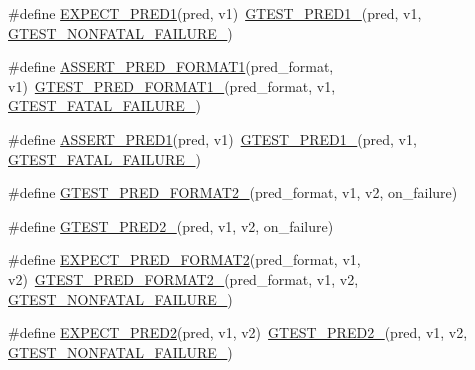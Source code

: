 \begin{DoxyCompactItemize}
\item 
\#define \hyperlink{fused-src_2gtest_2gtest_8h_a6d09aa83f8d297481380c7c073c9f070}{E\-X\-P\-E\-C\-T\-\_\-\-P\-R\-E\-D1}(pred, v1)~\hyperlink{gtest__pred__impl_8h_ad44cf322952076d85305bbdf39769ac1}{G\-T\-E\-S\-T\-\_\-\-P\-R\-E\-D1\-\_\-}(pred, v1, \hyperlink{gtest-internal_8h_a6cb7482cfa03661a91c698eb5895f642}{G\-T\-E\-S\-T\-\_\-\-N\-O\-N\-F\-A\-T\-A\-L\-\_\-\-F\-A\-I\-L\-U\-R\-E\-\_\-})
\item 
\#define \hyperlink{fused-src_2gtest_2gtest_8h_a3771ca0d1a72013aebc3d66e046491ed}{A\-S\-S\-E\-R\-T\-\_\-\-P\-R\-E\-D\-\_\-\-F\-O\-R\-M\-A\-T1}(pred\-\_\-format, v1)~\hyperlink{gtest__pred__impl_8h_aa3e3bfe04bb0e54d7f0e57e2f991d1eb}{G\-T\-E\-S\-T\-\_\-\-P\-R\-E\-D\-\_\-\-F\-O\-R\-M\-A\-T1\-\_\-}(pred\-\_\-format, v1, \hyperlink{gtest-internal_8h_a0f9a4c3ea82cc7bf4478eaffdc168358}{G\-T\-E\-S\-T\-\_\-\-F\-A\-T\-A\-L\-\_\-\-F\-A\-I\-L\-U\-R\-E\-\_\-})
\item 
\#define \hyperlink{fused-src_2gtest_2gtest_8h_a7d72f779b7d39b8f73a563ebc6d0604b}{A\-S\-S\-E\-R\-T\-\_\-\-P\-R\-E\-D1}(pred, v1)~\hyperlink{gtest__pred__impl_8h_ad44cf322952076d85305bbdf39769ac1}{G\-T\-E\-S\-T\-\_\-\-P\-R\-E\-D1\-\_\-}(pred, v1, \hyperlink{gtest-internal_8h_a0f9a4c3ea82cc7bf4478eaffdc168358}{G\-T\-E\-S\-T\-\_\-\-F\-A\-T\-A\-L\-\_\-\-F\-A\-I\-L\-U\-R\-E\-\_\-})
\item 
\#define \hyperlink{fused-src_2gtest_2gtest_8h_a115c18d1f752b7f091d577fb69cac372}{G\-T\-E\-S\-T\-\_\-\-P\-R\-E\-D\-\_\-\-F\-O\-R\-M\-A\-T2\-\_\-}(pred\-\_\-format, v1, v2, on\-\_\-failure)
\item 
\#define \hyperlink{fused-src_2gtest_2gtest_8h_ac560264104bd030b64034505d294a7b6}{G\-T\-E\-S\-T\-\_\-\-P\-R\-E\-D2\-\_\-}(pred, v1, v2, on\-\_\-failure)
\item 
\#define \hyperlink{fused-src_2gtest_2gtest_8h_af0141918615a5e2d5247e9cda8324dae}{E\-X\-P\-E\-C\-T\-\_\-\-P\-R\-E\-D\-\_\-\-F\-O\-R\-M\-A\-T2}(pred\-\_\-format, v1, v2)~\hyperlink{gtest__pred__impl_8h_a115c18d1f752b7f091d577fb69cac372}{G\-T\-E\-S\-T\-\_\-\-P\-R\-E\-D\-\_\-\-F\-O\-R\-M\-A\-T2\-\_\-}(pred\-\_\-format, v1, v2, \hyperlink{gtest-internal_8h_a6cb7482cfa03661a91c698eb5895f642}{G\-T\-E\-S\-T\-\_\-\-N\-O\-N\-F\-A\-T\-A\-L\-\_\-\-F\-A\-I\-L\-U\-R\-E\-\_\-})
\item 
\#define \hyperlink{fused-src_2gtest_2gtest_8h_a14e74e655e502914d3d07e083145ac91}{E\-X\-P\-E\-C\-T\-\_\-\-P\-R\-E\-D2}(pred, v1, v2)~\hyperlink{gtest__pred__impl_8h_ac560264104bd030b64034505d294a7b6}{G\-T\-E\-S\-T\-\_\-\-P\-R\-E\-D2\-\_\-}(pred, v1, v2, \hyperlink{gtest-internal_8h_a6cb7482cfa03661a91c698eb5895f642}{G\-T\-E\-S\-T\-\_\-\-N\-O\-N\-F\-A\-T\-A\-L\-\_\-\-F\-A\-I\-L\-U\-R\-E\-\_\-})

\end{DoxyCompactItemize}

